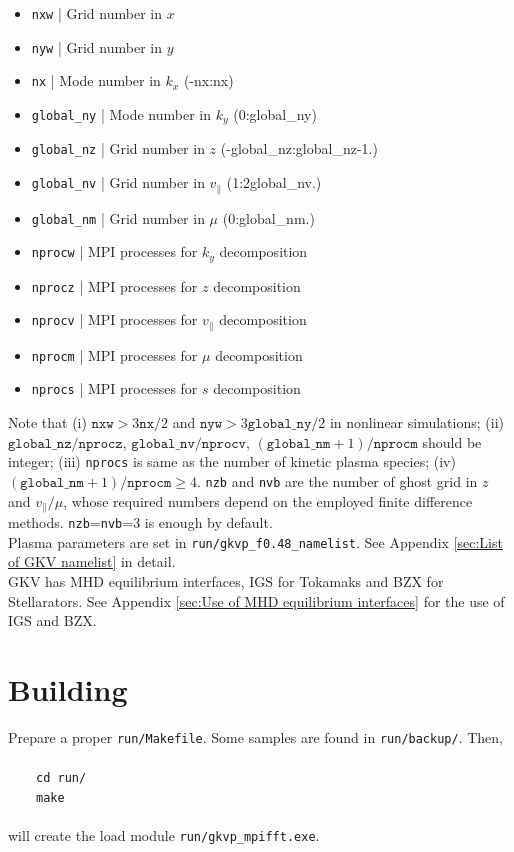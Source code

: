 \begin{itemize}
  \item \texttt{nxw} | Grid number in $x$
  \item \texttt{nyw} | Grid number in $y$
  \item \texttt{nx} | Mode number in $k_x$ (-nx:nx)
  \item \texttt{global\_ny} | Mode number in $k_y$ (0:global\_ny)
  \item \texttt{global\_nz} | Grid number in $z$ (-global\_nz:global\_nz-1.)
  \item \texttt{global\_nv} | Grid number in $v_\parallel$ (1:2global\_nv.)
  \item \texttt{global\_nm} | Grid number in $\mu$ (0:global\_nm.)
  \item \texttt{nprocw} | MPI processes for $k_y$ decomposition
  \item \texttt{nprocz} | MPI processes for $z$ decomposition
  \item \texttt{nprocv} | MPI processes for $v_\parallel$ decomposition
  \item \texttt{nprocm} | MPI processes for $\mu$ decomposition
  \item \texttt{nprocs} | MPI processes for $s$ decomposition
\end{itemize}
Note that (i) $\mathtt{nxw} > 3\mathtt{nx}/2$ and $\mathtt{nyw} > 3\mathtt{global\_ny}/2$ in nonlinear simulations; (ii) $\mathtt{global\_nz}/\mathtt{nprocz}$, $\mathtt{global\_nv}/\mathtt{nprocv}$, $(\mathtt{global\_nm}+1)/\mathtt{nprocm}$ should be integer; (iii) \texttt{nprocs} is same as the number of kinetic plasma species; (iv) $(\mathtt{global\_nm}+1)/\mathtt{nprocm} \geq 4$. \texttt{nzb} and \texttt{nvb} are the number of ghost grid in $z$ and $v_\parallel / \mu$, whose required numbers depend on the employed finite difference methods. \texttt{nzb}=\texttt{nvb}=3 is enough by default.\\

Plasma parameters are set in \texttt{run/gkvp\_f0.48\_namelist}. See Appendix \ref{sec:List of GKV namelist} in detail.\\

GKV has MHD equilibrium interfaces, IGS for Tokamaks and BZX for Stellarators. See Appendix \ref{sec:Use of MHD equilibrium interfaces} for the use of IGS and BZX.





\section{Building}
\label{sec:Building}
Prepare a proper \texttt{run/Makefile}. Some samples are found in \texttt{run/backup/}. Then, \\
~\\
~~~~\texttt{cd run/}\\
~~~~\texttt{make}\\
~\\
will create the load module \texttt{run/gkvp\_mpifft.exe}.\\

